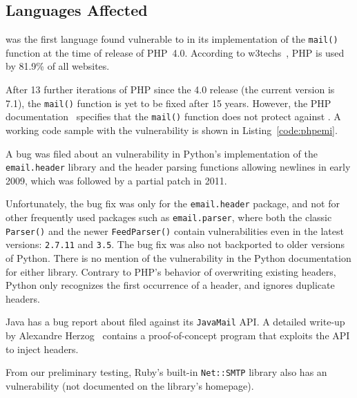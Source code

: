 \subsection{Languages Affected}
\label{languages}
 was the first language found vulnerable to \ehi in its implementation of the \texttt{mail()} function at the time of release of PHP~4.0. According to w3techs~\cite{W3techs}, PHP is used by 81.9\% of all websites.

After 13 further iterations of PHP since the 4.0 release (the current
version is 7.1), the \texttt{mail()} function is yet to be fixed after
15 years. However, the PHP documentation~\cite{PHPDocs} specifies that the \texttt{mail()} function does not protect against \ehi.
A working code sample with the vulnerability is shown in  Listing~\ref{code:phpemi}.

\begin{sloppypar}
A bug was filed about an \ehi vulnerability in Python's implementation of the \texttt{email.header} library and the header parsing functions allowing newlines in early 2009, which was followed by a partial patch in 2011.
\end{sloppypar}

Unfortunately, the bug fix was only for the \texttt{email.header} package, and not for other frequently used packages such as \texttt{email.parser}, where both the classic \texttt{Parser()} and the newer \texttt{FeedParser()} contain \ehi vulnerabilities even in the latest versions: \texttt{2.7.11} and \texttt{3.5}. The bug fix was also not backported to older versions of Python.
There is no mention of the vulnerability in the Python documentation for either library. Contrary to PHP's behavior of overwriting existing headers, Python only recognizes the first occurrence of a header, and ignores duplicate headers.


%

Java has a bug report about \ehi filed against its \texttt{JavaMail} API. A detailed write-up by Alexandre Herzog~\cite{Herzog.2014} contains a proof-of-concept program that exploits the API to inject headers.

\begin{sloppypar}
From our preliminary testing, Ruby's built-in \texttt{Net::SMTP} library also has an \ehi vulnerability (not documented on the library's homepage).
\end{sloppypar}
%



